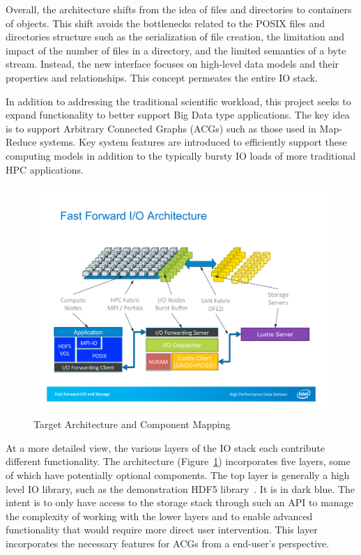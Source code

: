 \documentclass[conference]{IEEEtran}
\begin{document}
Overall, the architecture shifts from the idea of files and directories to
containers of objects. This shift avoids the bottlenecks related to the POSIX
files and directories structure such as the serialization of file creation, the
limitation and impact of the number of files in a directory, and the limited
semantics of a byte stream. Instead, the new interface focuses on high-level
data models and their properties and relationships. This concept permeates the
entire IO stack.

In addition to addressing the traditional scientific workload, this project
seeks to expand functionality to better support Big Data type applications. The
key idea is to support Arbitrary Connected Graphs (ACGs) such as those used in
Map-Reduce systems. Key system features are introduced to efficiently support
these computing models in addition to the typically bursty IO loads of more
traditional HPC applications.

\begin{figure}[htbp]
\vspace{-0.10in}
\centering
\includegraphics[width=\columnwidth]{images/arch-mapping}
\vspace{-0.15in}
\caption{Target Architecture and Component Mapping}
\label{fig:arch-mapping}
\vspace{-0.15in}
\end{figure}

At a more detailed view, the various layers of the IO stack each contribute
different functionality.  The architecture (Figure~\ref{fig:arch-mapping})
incorporates five layers, some of which have potentially optional components.
The top layer is generally a high level IO library, such as the demonstration
HDF5 library~\cite{hdf5}. It is in dark blue. The intent is to only have
access to the storage stack through such an API to manage the complexity of
working with the lower layers and to enable advanced functionality that would
require more direct user intervention. This layer incorporates the necessary
features for ACGs from a end-user's perspective.
\end{document}
